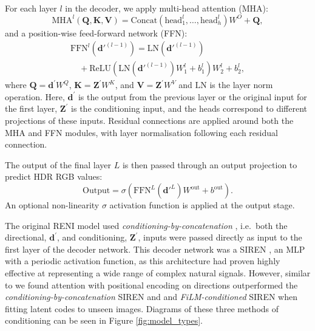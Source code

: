 For each layer \( l \) in the decoder, we apply multi-head attention (MHA):
\begin{equation}
    \text{MHA}^l(\mathbf{Q}, \mathbf{K}, \mathbf{V}) = \text{Concat}(\text{head}_1^l, \ldots, \text{head}_h^l)W^O + \mathbf{Q},
\end{equation}
and a position-wise feed-forward network (FFN):
\begin{multline}
\text{FFN}^l(\mathbf{d}'^{(l-1)}) = \text{LN}(\mathbf{d}'^{(l-1)}) \\
\quad + \text{ReLU}(\text{LN}(\mathbf{d}'^{(l-1)})W_1^l + b_1^l)W_2^l + b_2^l,
\end{multline}
where $ \mathbf{Q} = \mathbf{d}^\prime W^Q $, $ \mathbf{K} = \mathbf{Z}^\prime W^K $, and $ \mathbf{V} = \mathbf{Z}^\prime W^V $ and $\text{LN}$ is the layer norm operation. Here, $ \mathbf{d}^\prime $ is the output from the previous layer or the original input for the first layer, $ \mathbf{Z}^\prime $ is the conditioning input, and the heads correspond to different projections of these inputs. Residual connections are applied around both the MHA and FFN modules, with layer normalisation following each residual connection.

The output of the final layer $L$ is then passed through an output projection to predict HDR RGB values:
\begin{equation}
\text{Output} = \sigma(\text{FFN}^L(\mathbf{d}'^L)W^{\text{out}} + b^{\text{out}}).
\end{equation}
An optional non-linearity $ \sigma $ activation function is applied at the output stage.

The original RENI model \cite{gardner2022rotation} used \emph{conditioning-by-concatenation} \cite{sitzmann_implicit_2020, xie_neural_2021}, i.e.~both the directional, $\mathbf{d}^\prime$, and conditioning, $\mathbf{Z}^\prime$, inputs were passed directly as input to the first layer of the decoder network. This decoder network was a SIREN \cite{sitzmann_implicit_2020}, an MLP with a periodic activation function, as this architecture had proven highly effective at representing a wide range of complex natural signals. However, similar to \cite{rebainAttentionBeatsConcatenation2023} we found attention with positional encoding on directions outperformed the \emph{conditioning-by-concatenation} SIREN and \cite{sitzmann_implicit_2020, xie_neural_2021} and \emph{FiLM-conditioned} \cite{chan_pi-gan_2021} SIREN when fitting latent codes to unseen images. Diagrams of these three methods of conditioning can be seen in Figure \ref{fig:model_types}.


